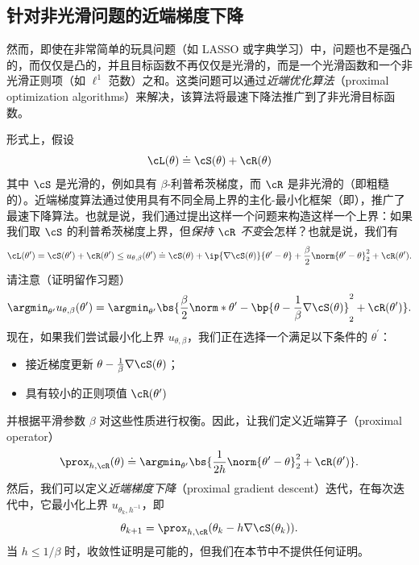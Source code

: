 \documentclass[../../book-main_zh.tex]{subfiles}
\begin{document}
\subsection{针对非光滑问题的近端梯度下降}\label{subsec:pgd}

然而，即使在非常简单的玩具问题（如 LASSO 或字典学习）中，问题也不是强凸的，而仅仅是凸的，并且目标函数不再仅仅是光滑的，而是一个光滑函数和一个非光滑正则项（如 \(\ell^{1}\) 范数）之和。这类问题可以通过\textit{近端优化算法}（proximal optimization algorithms）来解决，该算法将最速下降法推广到了非光滑目标函数。

形式上，假设
\begin{equation}
    \cL(\theta) \doteq \cS(\theta) + \cR(\theta)
\end{equation}
其中 \(\cS\) 是光滑的，例如具有 \(\beta\)-利普希茨梯度，而 \(\cR\) 是非光滑的（即粗糙的）。近端梯度算法通过使用具有不同全局上界的主化-最小化框架（即），推广了最速下降算法。也就是说，我们通过提出这样一个问题来构造这样一个上界：如果我们取 \(\cS\) 的利普希茨梯度上界，但\textit{保持 \(\cR\) 不变}会怎样？也就是说，我们有
\begin{equation}
    \cL(\theta^{\prime}) = \cS(\theta^{\prime}) +
    \cR(\theta^{\prime}) \leq u_{\theta, \beta}(\theta^{\prime})
    \doteq \cS(\theta) + \ip{\nabla \cS(\theta)}{\theta^{\prime} -
    \theta} + \frac{\beta}{2}\norm{\theta^{\prime} - \theta}_{2}^{2}
    + \cR(\theta^{\prime}).
\end{equation}
请注意（证明留作习题）
\begin{equation}
    \argmin_{\theta^{\prime}}u_{\theta, \beta}(\theta^{\prime}) =
    \argmin_{\theta^{\prime}}\bs{\frac{\beta}{2}\norm*{\theta^{\prime}
        - \bp{\theta - \frac{1}{\beta}\nabla \cS(\theta)}}_{2}^{2} +
    \cR(\theta^{\prime})}.
\end{equation}
现在，如果我们尝试最小化上界 \(u_{\theta, \beta}\)，我们正在选择一个满足以下条件的 \(\theta^{\prime}\)：
\begin{itemize}
    \item 接近梯度更新 \(\theta - \frac{1}{\beta}\nabla \cS(\theta)\)；
    \item 具有较小的正则项值 \(\cR(\theta^{\prime})\)
\end{itemize}
并根据平滑参数 \(\beta\) 对这些性质进行权衡。因此，让我们定义近端算子（proximal operator）
\begin{equation}
    \prox_{h, \cR}(\theta) \doteq
    \argmin_{\theta^{\prime}}\bs{\frac{1}{2h}\norm{\theta^{\prime} -
    \theta}_{2}^{2} + \cR(\theta^{\prime})}.
\end{equation}
然后，我们可以定义\textit{近端梯度下降}（proximal gradient descent）迭代，在每次迭代中，它最小化上界 \(u_{\theta_{k}, h^{-1}}\)，即
\begin{equation}
    \theta_{k + 1} = \prox_{h, \cR}(\theta_{k} - h\nabla \cS(\theta_{k})).
\end{equation}
当 \(h \leq 1/\beta\) 时，收敛性证明是可能的，但我们在本节中不提供任何证明。
\end{document}
